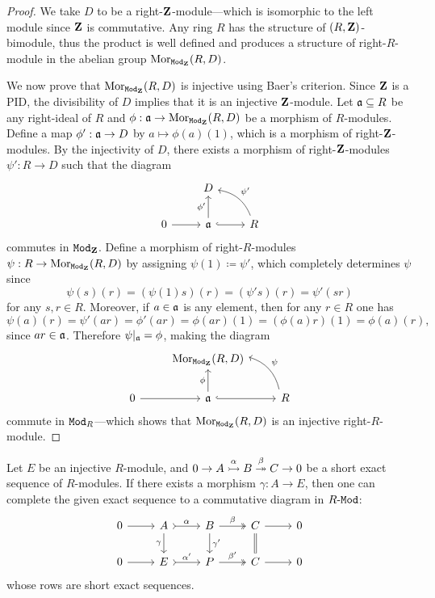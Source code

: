 \begin{proof}
We take \(D\) to be a right-\(\mathbf{Z}\)-module---which is isomorphic to the left
module since \(\mathbf{Z}\) is commutative. Any ring \(R\) has the structure of
\((R, \mathbf{Z})\)-bimodule, thus the product is well defined and produces a structure
of right-\(R\)-module in the abelian group \(\operatorname{Mor}_{{\texttt{Mod}_{\mathbf{Z}}}}(R, D)\).

We now prove that \(\operatorname{Mor}_{{\texttt{Mod}_{\mathbf{Z}}}}(R, D)\) is injective using Baer's
criterion. Since \(\mathbf{Z}\) is a PID, the divisibility of \(D\) implies that it is
an injective \(\mathbf{Z}\)-module. Let \(\mathfrak{a} \subseteq R\) be any right-ideal of
\(R\) and \(\phi: \mathfrak{a} \to \operatorname{Mor}_{{\texttt{Mod}_{\mathbf{Z}}}}(R, D)\) be a morphism of
\(R\)-modules. Define a map \(\phi': \mathfrak{a} \to D\) by
\(a \mapsto \phi(a)(1)\), which is a morphism of right-\(\mathbf{Z}\)-modules. By the
injectivity of \(D\), there exists a morphism of right-\(\mathbf{Z}\)-modules
\(\psi': R \to D\) such that the diagram
\[
\begin{tikzcd}
&D &
\\
0 \ar[r] &\ideal a \ar[u, "\phi'"] \ar[r, hook]
&R \ar[lu, "\psi'"', bend right]
\end{tikzcd}
\]
commutes in \({\texttt{Mod}_{\mathbf{Z}}}\). Define a morphism of right-\(R\)-modules
\(\psi: R \to \operatorname{Mor}_{{\texttt{Mod}_{\mathbf{Z}}}}(R, D)\) by assigning \(\psi(1) \coloneq \psi'\),
which completely determines \(\psi\) since
\[
\psi(s)(r) = (\psi(1) s) (r) = (\psi' s)(r) = \psi'(s r)
\]
for any \(s, r \in R\). Moreover, if \(a \in \mathfrak{a}\) is any element, then for
any \(r \in R\) one has
\[
\psi(a)(r)
= \psi'(a r)
= \phi'(a r)
= \phi(a r)(1)
= (\phi(a) r)(1)
= \phi(a)(r),
\]
since \(a r \in \mathfrak{a}\). Therefore \(\psi|_{\mathfrak{a}} = \phi\), making the
diagram
\[
\begin{tikzcd}
&\Hom_{\rMod{\Z}}(R, D) &
\\
0 \ar[r] &\ideal a \ar[u, "\phi"] \ar[r, hook]
&R \ar[lu, "\psi"', bend right]
\end{tikzcd}
\]
commute in \({\texttt{Mod}_{R}}\)---which shows that \(\operatorname{Mor}_{{\texttt{Mod}_{\mathbf{Z}}}}(R, D)\) is an
injective right-\(R\)-module.
\end{proof}

\begin{lemma}
\label{lem:injective-module-completing-sequences}
Let \(E\) be an injective \(R\)-module, and
\(0 \to A \overset \alpha {\rightarrowtail} B \overset \beta {\twoheadrightarrow} C \to 0\) be a short exact
sequence of \(R\)-modules. If there exists a morphism \(\gamma: A \to E\), then
one can complete the given exact sequence to a commutative diagram in
\({R\text{-}\texttt{Mod}}\):
\[
\begin{tikzcd}
0 \ar[r]
&A \ar[r, tail, "\alpha"] \ar[d, "\gamma"']
&B \ar[r, two heads, "\beta"] \ar[d, "\gamma'"]
&C \ar[d, equals] \ar[r]
&0
\\
0 \ar[r]
&E \ar[r, tail, "\alpha'"]
&P \ar[r, two heads, "\beta'"]
&C \ar[r]
&0
\end{tikzcd}
\]
whose rows are short exact sequences.
\end{lemma}


